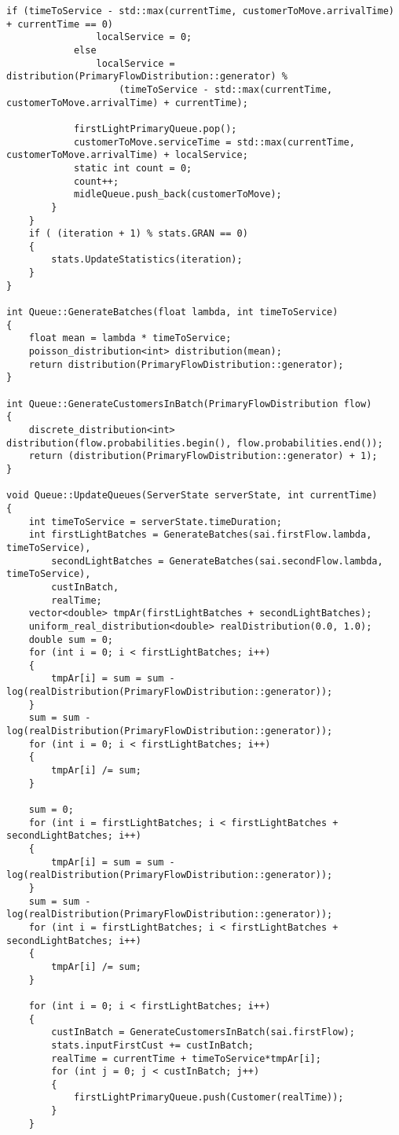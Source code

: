 \begin{lstlisting}[language={[ISO]C++}]
            if (timeToService - std::max(currentTime, customerToMove.arrivalTime) + currentTime == 0)
                localService = 0;
            else
                localService = distribution(PrimaryFlowDistribution::generator) %
                    (timeToService - std::max(currentTime, customerToMove.arrivalTime) + currentTime);

            firstLightPrimaryQueue.pop();
            customerToMove.serviceTime = std::max(currentTime, customerToMove.arrivalTime) + localService;
            static int count = 0;
            count++;
            midleQueue.push_back(customerToMove);
  	    }
    }
    if ( (iteration + 1) % stats.GRAN == 0)
    {
        stats.UpdateStatistics(iteration);
    }
}

int Queue::GenerateBatches(float lambda, int timeToService)
{
    float mean = lambda * timeToService;
    poisson_distribution<int> distribution(mean);
    return distribution(PrimaryFlowDistribution::generator);
}

int Queue::GenerateCustomersInBatch(PrimaryFlowDistribution flow)
{
    discrete_distribution<int> distribution(flow.probabilities.begin(), flow.probabilities.end());
    return (distribution(PrimaryFlowDistribution::generator) + 1);
}

void Queue::UpdateQueues(ServerState serverState, int currentTime)
{
    int timeToService = serverState.timeDuration;
    int firstLightBatches = GenerateBatches(sai.firstFlow.lambda, timeToService),
        secondLightBatches = GenerateBatches(sai.secondFlow.lambda, timeToService),
        custInBatch,
        realTime;
    vector<double> tmpAr(firstLightBatches + secondLightBatches);
    uniform_real_distribution<double> realDistribution(0.0, 1.0);
    double sum = 0;
    for (int i = 0; i < firstLightBatches; i++)
    {
        tmpAr[i] = sum = sum - log(realDistribution(PrimaryFlowDistribution::generator));
    }
    sum = sum - log(realDistribution(PrimaryFlowDistribution::generator));
    for (int i = 0; i < firstLightBatches; i++)
    {
        tmpAr[i] /= sum;
    }

    sum = 0;
    for (int i = firstLightBatches; i < firstLightBatches + secondLightBatches; i++)
    {
        tmpAr[i] = sum = sum - log(realDistribution(PrimaryFlowDistribution::generator));
    }
    sum = sum - log(realDistribution(PrimaryFlowDistribution::generator));
    for (int i = firstLightBatches; i < firstLightBatches + secondLightBatches; i++)
    {
        tmpAr[i] /= sum;
    }

    for (int i = 0; i < firstLightBatches; i++)
    {
        custInBatch = GenerateCustomersInBatch(sai.firstFlow);
        stats.inputFirstCust += custInBatch;
        realTime = currentTime + timeToService*tmpAr[i];
        for (int j = 0; j < custInBatch; j++)
        {
            firstLightPrimaryQueue.push(Customer(realTime));
        }
    }


\end{lstlisting}
